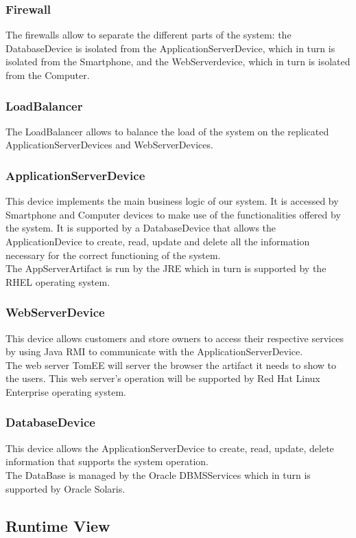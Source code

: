 \subsubsection{Firewall}
The firewalls allow to separate the different parts of the system: the DatabaseDevice is isolated from the ApplicationServerDevice, which in turn is isolated from the Smartphone, and the WebServerdevice, which in turn is isolated from the Computer.
\subsubsection{LoadBalancer}
The LoadBalancer allows to balance the load of the system on the replicated ApplicationServerDevices and WebServerDevices.
\subsubsection{ApplicationServerDevice}
This device implements the main business logic of our system. It is accessed by Smartphone and Computer devices to make use of the functionalities offered by the system. It is supported by a DatabaseDevice that allows the ApplicationDevice to create, read, update and delete all the information necessary for the correct functioning of the system.\\
The AppServerArtifact is run by the JRE which in turn is supported by the RHEL operating system.
\subsubsection{WebServerDevice}
This device allows customers and store owners to access their respective services by using Java RMI to communicate with the ApplicationServerDevice.\\
The web server TomEE will server the browser the artifact it needs to show to the users. This web server's operation will be supported by Red Hat Linux Enterprise operating system.
\subsubsection{DatabaseDevice}
This device allows the ApplicationServerDevice to create, read, update, delete information that supports the system operation.\\
The DataBase is managed by the Oracle DBMSServices which in turn is supported by Oracle Solaris.\newpage
\subsection{Runtime View}
